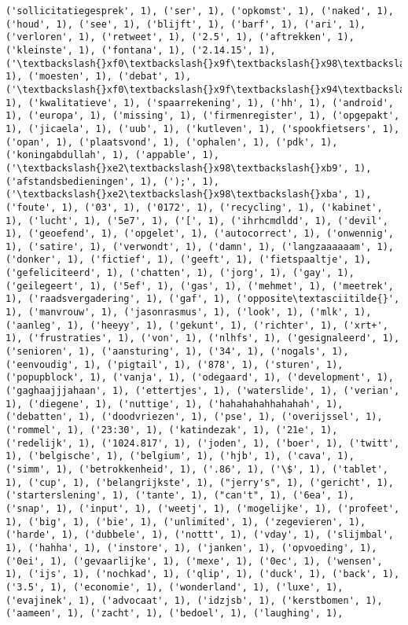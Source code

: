 \documentclass{article}
\begin{document}
\begin{Verbatim}[commandchars=\\\{\}]
('sollicitatiegesprek', 1), ('ser', 1), ('opkomst', 1), ('naked', 1), ('houd', 1), ('see', 1), ('blijft', 1), ('barf', 1), ('ari', 1), ('verloren', 1), ('retweet', 1), ('2.5', 1), ('aftrekken', 1), ('kleinste', 1), ('fontana', 1), ('2.14.15', 1), ('\textbackslash{}xf0\textbackslash{}x9f\textbackslash{}x98\textbackslash{}xa9', 1), ('moesten', 1), ('debat', 1), ('\textbackslash{}xf0\textbackslash{}x9f\textbackslash{}x94\textbackslash{}xa5\textbackslash{}xf0\textbackslash{}x9f\textbackslash{}x94\textbackslash{}xa5\textbackslash{}xf0\textbackslash{}x9f\textbackslash{}x94\textbackslash{}xa5\textbackslash{}xf0\textbackslash{}x9f\textbackslash{}x94\textbackslash{}xa5', 1), ('kwalitatieve', 1), ('spaarrekening', 1), ('hh', 1), ('android', 1), ('europa', 1), ('missing', 1), ('firmenregister', 1), ('opgepakt', 1), ('jicaela', 1), ('uub', 1), ('kutleven', 1), ('spookfietsers', 1), ('opan', 1), ('plaatsvond', 1), ('ophalen', 1), ('pdk', 1), ('koningabdullah', 1), ('appable', 1), ('\textbackslash{}xe2\textbackslash{}x98\textbackslash{}xb9', 1), ('afstandsbedieningen', 1), (');', 1), ('\textbackslash{}xe2\textbackslash{}x98\textbackslash{}xba', 1), ('foute', 1), ('03', 1), ('0172', 1), ('recycling', 1), ('kabinet', 1), ('lucht', 1), ('5e7', 1), ('[', 1), ('ihrhcmdldd', 1), ('devil', 1), ('geoefend', 1), ('opgelet', 1), ('autocorrect', 1), ('onwennig', 1), ('satire', 1), ('verwondt', 1), ('damn', 1), ('langzaaaaaam', 1), ('donker', 1), ('fictief', 1), ('geeft', 1), ('fietspaaltje', 1), ('gefeliciteerd', 1), ('chatten', 1), ('jorg', 1), ('gay', 1), ('geilegeert', 1), ('5ef', 1), ('gas', 1), ('mehmet', 1), ('meetrek', 1), ('raadsvergadering', 1), ('gaf', 1), ('opposite\textasciitilde{}', 1), ('manvrouw', 1), ('jasonrasmus', 1), ('look', 1), ('mlk', 1), ('aanleg', 1), ('heeyy', 1), ('gekunt', 1), ('richter', 1), ('xrt+', 1), ('frustraties', 1), ('von', 1), ('nlhfs', 1), ('gesignaleerd', 1), ('senioren', 1), ('aansturing', 1), ('34', 1), ('nogals', 1), ('eenvoudig', 1), ('pigtail', 1), ('878', 1), ('sturen', 1), ('popupblock', 1), ('vanja', 1), ('odegaard', 1), ('development', 1), ('gaghaajjjahaan', 1), ('ettertjes', 1), ('waterslide', 1), ('verian', 1), ('diegene', 1), ('nuttige', 1), ('hahahahahhahahah', 1), ('debatten', 1), ('doodvriezen', 1), ('pse', 1), ('overijssel', 1), ('rommel', 1), ('23:30', 1), ('katindezak', 1), ('21e', 1), ('redelijk', 1), ('1024.817', 1), ('joden', 1), ('boer', 1), ('twitt', 1), ('belgische', 1), ('belgium', 1), ('hjb', 1), ('cava', 1), ('simm', 1), ('betrokkenheid', 1), ('.86', 1), ('\$', 1), ('tablet', 1), ('cup', 1), ('belangrijkste', 1), ("jerry's", 1), ('gericht', 1), ('starterslening', 1), ('tante', 1), ("can't", 1), ('6ea', 1), ('snap', 1), ('input', 1), ('weetj', 1), ('mogelijke', 1), ('profeet', 1), ('big', 1), ('bie', 1), ('unlimited', 1), ('zegevieren', 1), ('harde', 1), ('dubbele', 1), ('nottt', 1), ('vday', 1), ('slijmbal', 1), ('hahha', 1), ('instore', 1), ('janken', 1), ('opvoeding', 1), ('0ei', 1), ('gevaarlijke', 1), ('mexe', 1), ('0ec', 1), ('wensen', 1), ('ijs', 1), ('nochkad', 1), ('qlip', 1), ('duck', 1), ('back', 1), ('3.5', 1), ('economie', 1), ('wonderland', 1), ('luxe', 1), ('evajinek', 1), ('advocaat', 1), ('idzjsb', 1), ('kerstbomen', 1), ('aameen', 1), ('zacht', 1), ('bedoel', 1), ('laughing', 1), 
\end{Verbatim}
\end{document}
